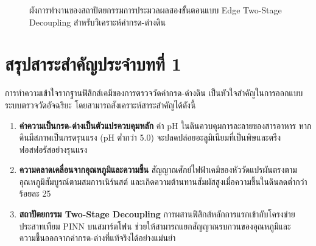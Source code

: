 \begin{figure}[H]
\centering
{}
\caption{ผังการทำงานของสถาปัตยกรรมการประมวลผลสองขั้นตอนแบบ Edge Two-Stage Decoupling สำหรับวิเคราะห์ค่ากรด-ด่างดิน}
\label{fig:two_stage_arch}
\end{figure}

\section{สรุปสาระสำคัญประจำบทที่ 1}

การทำความเข้าใจรากฐานฟิสิกส์เคมีของการตรวจวัดค่ากรด-ด่างดิน เป็นหัวใจสำคัญในการออกแบบระบบตรวจวัดอัจฉริยะ โดยสามารถสังเคราะห์สาระสำคัญได้ดังนี้
\begin{enumerate}
    \item \textbf{ค่าความเป็นกรด-ด่างเป็นตัวแปรควบคุมหลัก} ค่า pH ในดินควบคุมการละลายของสารอาหาร หากดินมีสภาพเป็นกรดรุนแรง (pH ต่ำกว่า 5.0) จะปลดปล่อยอะลูมิเนียมที่เป็นพิษและตรึงฟอสฟอรัสอย่างรุนแรง
    \item \textbf{ความคลาดเคลื่อนจากอุณหภูมิและความชื้น} สัญญาณศักย์ไฟฟ้าเคมีของหัววัดแปรผันตรงตามอุณหภูมิสัมบูรณ์ตามสมการเนิร์นสต์ และเกิดความต้านทานสัมผัสสูงเมื่อความชื้นในดินลดต่ำกว่าร้อยละ 25
    \item \textbf{สถาปัตยกรรม Two-Stage Decoupling} การผสานฟิสิกส์หลักการแรกเข้ากับโครงข่ายประสาทเทียม PINN บนสมาร์ตโฟน ช่วยให้สามารถแยกสัญญาณรบกวนของอุณหภูมิและความชื้นออกจากค่ากรด-ด่างที่แท้จริงได้อย่างแม่นยำ
\end{enumerate}


